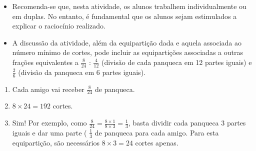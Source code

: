   
\begin{orientacoes}{}{}
\begin{itemize} %
    \item       Recomenda-se que, nesta atividade, os alunos trabalhem
individualmente ou em duplas. No entanto, é fundamental que os alunos sejam
estimulados a explicar o raciocínio realizado.
    \item       A discussão da atividade, além da equipartição dada e aquela
associada ao número mínimo de cortes, pode incluir as equipartições associadas a
outras frações equivalentes a       $\frac{8}{24}$      :       $\frac{4}{12}$
    (divisão de cada panqueca em 12 partes iguais) e       $\frac{2}{6}$
(divisão da panqueca em 6 partes iguais).
\end{itemize} %





\end{orientacoes}


\begin{solucao}{}{}
\begin{enumerate} [\quad a)] %
    \item       Cada amigo vai receber       $\frac{8}{24}$       de panqueca.
    \item             $8 \times 24 = 192$       cortes.
    \item       Sim! Por exemplo, como       $\frac{8}{24} = \frac{8 \times 1}{8
\times 3} = \frac{1}{3}$, basta dividir cada panqueca       $3$       partes
iguais e dar uma parte (      $\frac{1}{3}$       de panqueca para cada amigo.
Para esta equipartição, são necessários       $8 \times 3 = 24$       cortes
apenas.
\end{enumerate} %

\end{solucao}



